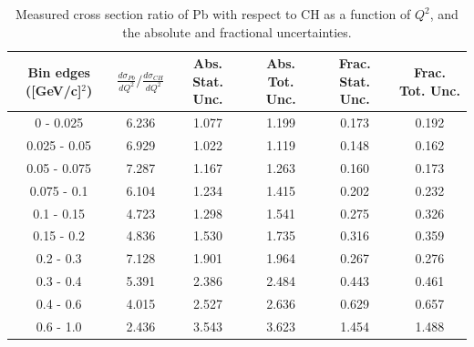 \documentclass[aps,prl,twocolumn,superscriptaddress,nofootinbib]{revtex4-1}
\begin{document}
\begin{table}[h!]
  \centering
  \caption{Measured cross section ratio of Pb with respect to CH as a function
  of $Q^{2}$,  and the absolute and fractional uncertainties.}
    \begin{tabular}{c||c||c|c||c|c}
      Bin edges ([GeV/c]$^{2}$) & $\frac{d\sigma_{Pb}}{dQ^{2}}/\frac{d\sigma_{CH}}{dQ^{2}}$ & Abs. Stat. Unc. & Abs. Tot. Unc. & Frac. Stat. Unc. & Frac. Tot. Unc. \\
      \hline\hline
         0 - 0.025 & 6.236 & 1.077 & 1.199 & 0.173 & 0.192 \\
      0.025 - 0.05 & 6.929 & 1.022 & 1.119 & 0.148 & 0.162 \\
      0.05 - 0.075 & 7.287 & 1.167 & 1.263 & 0.160 & 0.173 \\
       0.075 - 0.1 & 6.104 & 1.234 & 1.415 & 0.202 & 0.232 \\
        0.1 - 0.15 & 4.723 & 1.298 & 1.541 & 0.275 & 0.326 \\
        0.15 - 0.2 & 4.836 & 1.530 & 1.735 & 0.316 & 0.359 \\
         0.2 - 0.3 & 7.128 & 1.901 & 1.964 & 0.267 & 0.276 \\
         0.3 - 0.4 & 5.391 & 2.386 & 2.484 & 0.443 & 0.461 \\
         0.4 - 0.6 & 4.015 & 2.527 & 2.636 & 0.629 & 0.657 \\
         0.6 - 1.0 & 2.436 & 3.543 & 3.623 & 1.454 & 1.488 \\
    \end{tabular}
  \label{table:Q2XSecRatio_Pb}
\end{table}
\end{document}
